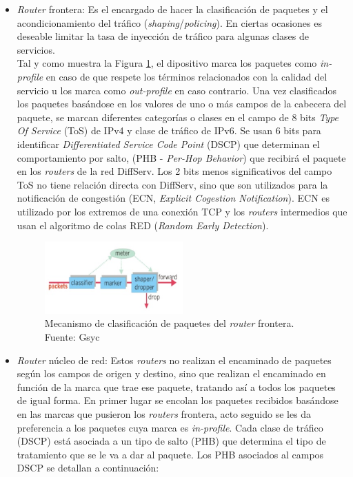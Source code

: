 	\begin{itemize}
	    \item \textit{Router} frontera: Es el encargado de hacer la clasificación de paquetes y el acondicionamiento del tráfico (\textit{shaping}/\textit{policing}). En ciertas ocasiones es deseable limitar la tasa de inyección de tráfico para algunas clases de servicios. \\
	    Tal y como muestra la Figura \ref{edgerouter}, el dipositivo marca los paquetes como \textit{in-profile} en caso de que respete los términos relacionados con la calidad del servicio u los marca como \textit{out-profile} en caso contrario. Una vez clasificados los paquetes basándose en los valores de uno o más campos de la cabecera del paquete, se marcan diferentes categorías o clases en el campo de 8 bits \textit{Type Of Service} (ToS) de IPv4 y clase de tráfico de IPv6. Se usan 6 bits para identificar \textit{Differentiated Service Code Point} (DSCP) que determinan el comportamiento por salto, (PHB - \textit{Per-Hop Behavior}) que recibirá el paquete en los \textit{routers} de la red DiffServ. Los 2 bits menos significativos del campo ToS no tiene relación directa con DiffServ, sino que son utilizados para la notificación de congestión (ECN, \textit{Explicit Cogestion Notification}). ECN es utilizado por los extremos de una conexión TCP y los \textit{routers} intermedios que usan el algoritmo de colas RED (\textit{Random Early Detection}).
	    \begin{figure}[H]
			\centering
			\includegraphics[width=0.5\textwidth]{img/edgerouter.PNG}
			\caption{Mecanismo de clasificación de paquetes del \textit{router} frontera. Fuente: Gsyc}
			\label{edgerouter}
		\end{figure}
	\item \textit{Router} núcleo de red: Estos \textit{routers} no realizan el encaminado de paquetes según los campos de origen y destino, sino que realizan el encaminado en función de la marca que trae ese paquete, tratando así a todos los paquetes de igual forma. En primer lugar se encolan los paquetes recibidos basándose en las marcas que pusieron los \textit{routers} frontera, acto seguido se les da preferencia a los paquetes cuya marca es \textit{in-profile}. Cada clase de tráfico (DSCP) está asociada a un tipo de salto (PHB) que determina el tipo de tratamiento que se le va a dar al paquete. Los PHB asociados al campos DSCP se detallan a continuación:

\end{itemize}
